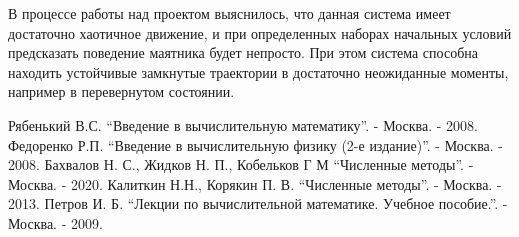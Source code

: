 \documentclass[a4paper,12pt]{article}
\begin{document}
	В процессе работы над проектом выяснилось, что данная система имеет
	достаточно хаотичное движение, и при определенных наборах начальных условий
	предсказать поведение маятника будет непросто. При этом система способна
	находить устойчивые замкнутые траектории в достаточно неожиданные моменты,
	например в перевернутом состоянии.

	\begin{thebibliography}{w:40}
		
		 Рябенький В.С. ``Введение в вычислительную 
		математику''. - Москва. - 2008.
		 Федоренко Р.П. ``Введение в вычислительную физику 
		(2-е издание)''. - Москва. - 2008.
		 Бахвалов Н. С., Жидков Н. П., Кобельков Г М
		``Численные методы''. - Москва. - 2020.
		 Калиткин Н.Н., Корякин П. В. ``Численные методы''. 
		- Москва. - 2013.
		 Петров И. Б. ``Лекции по вычислительной математике. 
		Учебное пособие.''. - Москва. - 2009.
		
	\end{thebibliography}
	
	
\end{document}
